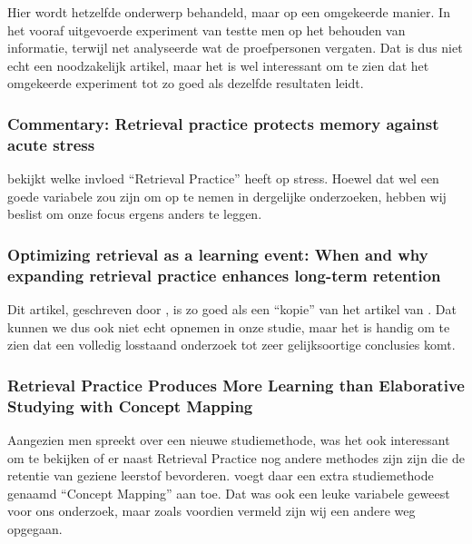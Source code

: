 \documentclass{hogent-article}
\begin{document}
Hier wordt hetzelfde onderwerp behandeld, maar op een omgekeerde manier. In het vooraf uitgevoerde experiment van \cite{HenryRoediger2006} testte men op het behouden van informatie, terwijl \cite{BenjaminStorm2009} net analyseerde wat de proefpersonen vergaten. Dat is dus niet echt een noodzakelijk artikel, maar het is wel interessant om te zien dat het omgekeerde experiment tot zo goed als dezelfde resultaten leidt. 

\subsubsection{Commentary: Retrieval practice protects memory against acute stress}

\cite{Smith2016} bekijkt welke invloed ``Retrieval Practice'' heeft op stress. Hoewel dat wel een goede variabele zou zijn om op te nemen in dergelijke onderzoeken, hebben wij beslist om onze focus ergens anders te leggen.

\subsubsection{Optimizing retrieval as a learning event: When and why expanding retrieval practice enhances long-term retention}

Dit artikel, geschreven door \cite{Storm2010}, is zo goed als een ``kopie'' van het artikel van \cite{HenryRoediger2006}. Dat kunnen we dus ook niet echt opnemen in onze studie, maar het is handig om te zien dat een volledig losstaand onderzoek tot zeer gelijksoortige conclusies komt. 

\subsubsection{Retrieval Practice Produces More Learning than Elaborative Studying with Concept Mapping}

Aangezien men spreekt over een nieuwe studiemethode, was het ook interessant om te bekijken of er naast Retrieval Practice nog andere methodes zijn zijn die de retentie van geziene leerstof bevorderen. \cite{JeffreyKarpicke2011} voegt daar een extra studiemethode genaamd ``Concept Mapping'' aan toe. Dat was ook een leuke variabele geweest voor ons onderzoek, maar zoals voordien vermeld zijn wij een andere weg opgegaan.


\printbibliography[heading=bibintoc]
\end{document}
